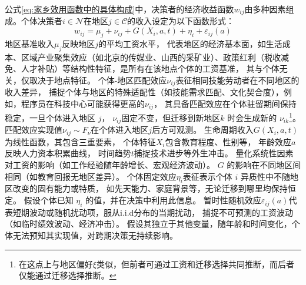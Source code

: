 \documentclass[a4paper,12pt,oneside]{book} %
\begin{document}
公式\ref{eq:家乡效用函数中的具体构成}中，决策者的经济收益函数$w_{ij}$由多种因素组成。个体决策者$i \in \mathcal{N}$在地区$j \in \mathcal{C}$的收入设定为以下函数形式：
\begin{equation}
  w_{ij}=\mu_j + \nu_{ij} + G(X_i,a,t) + \eta_i + \varepsilon_{ij}(a)
  \label{eq:经济收益函数}
\end{equation}
地区基准收入$\mu_j$反映地区$j$的平均工资水平，
代表地区的经济基本面，如生活成本、区域产业聚集效应（如北京的传媒业、山西的采矿业）、政策红利（税收减免、人才补贴）等结构性特征，是所有在该地点个体的工资基准，
其与个体无关，仅取决于地点特征。
个体-地区匹配效应$\nu_{ij}$表征相同技能劳动者在不同地区的收入差异，
捕捉个体与地区的特殊适配性（如技能需求匹配、文化契合度），例如，程序员在科技中心可能获得更高的$\nu_{ij}$，
其具备匹配效应在个体驻留期间保持稳定，一旦个体进入地区 $j$，
$\nu_{ij}$固定不变，但迁移到新地区$k$ 时会生成新的 $\nu_{ik}$\footnote{在这点上与地区偏好$\xi$类似，但前者可通过工资和迁移选择共同推断，而后者仅能通过迁移选择推断。}。
匹配效应实现值$\nu_{ij} \sim F_\nu$在个体进入地区$j$后方可观测。
生命周期收入$G(X_i,a,t)$为线性函数，其包含三重要素，
个体特征$X_i$包含教育程度、性别等，
年龄效应$a$反映人力资本积累曲线，
时间趋势$t$捕捉技术进步等外生冲击。
量化系统性因素对工资的影响（如工作经验随年龄增长、宏观经济波动）。
$G$ 的影响在不同地区间相同（如教育回报无地区差异）。
个体固定效应$\eta_i$表征表示个体 $i$ 异质性中不随地区改变的固有能力或特质，
如先天能力、家庭背景等，无论迁移到哪里均保持恒定。
假设个体已知 $\eta_i$ 的值，并在决策中利用此信息。
暂时性随机效应$\varepsilon_{ij}(a)$代表短期波动或随机扰动项，服从i.i.d分布的当期扰动，
捕捉不可预测的工资波动（如临时绩效波动、经济冲击）。  
假设其独立于其他变量，随年龄和时间变化，个体无法预知其实现值，对跨期决策无持续影响。
\end{document}
